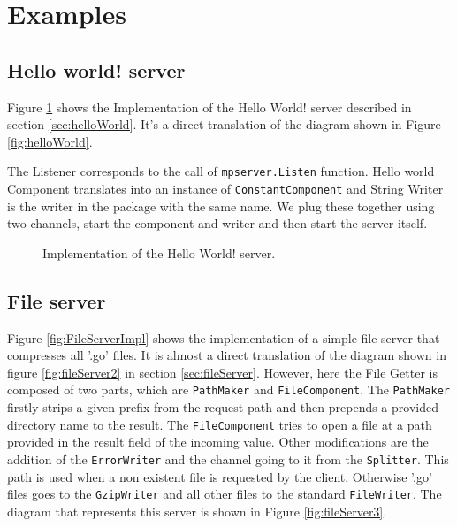 \section{Examples}
\label{sec:examples}
\subsection{Hello world! server}
Figure \ref{fig:HelloWorldImpl} shows the Implementation of the Hello World!
server described in section \ref{sec:helloWorld}.
It's a direct translation of the diagram shown in Figure \ref{fig:helloWorld}.

The Listener corresponds to the call of \texttt{mpserver.Listen} function.
Hello world Component translates into an instance of \texttt{ConstantComponent}
and String Writer is the writer in the package with the same name.
We plug these together using two channels, start the component and writer 
and then start the server itself.

\begin{figure}[h]
\centering

\caption[scale=1.0]{Implementation of the Hello World! server.}
\label{fig:HelloWorldImpl}
\end{figure}

\newpage
\subsection{File server}
Figure \ref{fig:FileServerImpl} shows the implementation of a simple 
file server that compresses all '.go' files. It is almost a direct translation
of the diagram shown in figure \ref{fig:fileServer2} in section \ref{sec:fileServer}.
However, here the File Getter is composed of two parts, which are \texttt{PathMaker}
and \texttt{FileComponent}. The \texttt{PathMaker} firstly strips a given
prefix from the request path and then prepends a provided directory name to 
the result. The \texttt{FileComponent} tries to open a file at a path 
provided in the result field of the incoming value. Other modifications
are the addition of the \texttt{ErrorWriter} and the channel going to it from
the \texttt{Splitter}.
This path is used when a non existent file is requested by the client.
Otherwise '.go' files goes to the \texttt{GzipWriter} and all other files to 
the standard \texttt{FileWriter}.
The diagram that represents this server is shown in 
Figure \ref{fig:fileServer3}.

